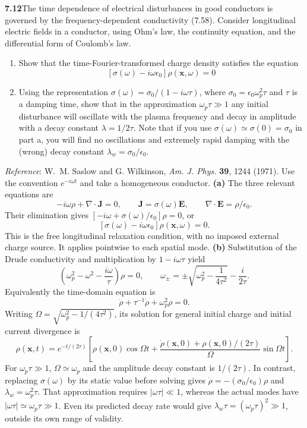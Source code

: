 \par\bigskip
\noindent\textbf{7.12}\quad The time dependence of electrical disturbances in good conductors is governed by the frequency-dependent conductivity (7.58). Consider longitudinal electric fields in a conductor, using Ohm's law, the continuity equation, and the differential form of Coulomb's law.
\begin{enumerate}
\item[(a)] Show that the time-Fourier-transformed charge density satisfies the equation
\[
[\sigma(\omega)-i\omega\epsilon_{0}]\rho(\mathbf{x},\omega)=0
\]
\item[(b)] Using the representation $\sigma(\omega)=\sigma_{0}/(1-i\omega\tau)$, where $\sigma_{0}=\epsilon_{0}\omega_{p}^{2}\tau$ and $\tau$ is a damping time, show that in the approximation $\omega_{p}\tau\gg1$ any initial disturbance will oscillate with the plasma frequency and decay in amplitude with a decay constant $\lambda=1/2\tau$. Note that if you use $\sigma(\omega)\simeq\sigma(0)=\sigma_{0}$ in part a, you will find no oscillations and extremely rapid damping with the (wrong) decay constant $\lambda_{w}=\sigma_{0}/\epsilon_{0}$.
\end{enumerate}
\emph{Reference}: W.~M. Saslow and G. Wilkinson, \emph{Am. J. Phys.} \textbf{39}, 1244 (1971).
\solution
Use the convention $e^{-i\omega t}$ and take a homogeneous conductor.
\textbf{(a)} The three relevant equations are
\[
-i\omega\rho+\nabla\cdot\mathbf J=0,\qquad
\mathbf J=\sigma(\omega)\mathbf E,\qquad
\nabla\cdot\mathbf E=\rho/\epsilon_0.
\]
Their elimination gives
$[-i\omega+\sigma(\omega)/\epsilon_0]\rho=0$, or
\[
\boxed{[\sigma(\omega)-i\omega\epsilon_0]\rho(\mathbf x,\omega)=0.}
\]
This is the free longitudinal relaxation condition, with no imposed
external charge source. It applies pointwise to each spatial mode.
\textbf{(b)} Substitution of the Drude conductivity and multiplication
by $1-i\omega\tau$ yield
\[
\left(\omega_p^2-\omega^2-\frac{i\omega}{\tau}\right)\rho=0,
\qquad
\omega_\pm=\pm\sqrt{\omega_p^2-\frac{1}{4\tau^2}}-\frac{i}{2\tau}.
\]
Equivalently the time-domain equation is
\[
\ddot\rho+\tau^{-1}\dot\rho+\omega_p^2\rho=0.
\]
Writing $\Omega=\sqrt{\omega_p^2-1/(4\tau^2)}$, its solution for
general initial charge and initial current divergence is
\[
\boxed{\rho(\mathbf x,t)=e^{-t/(2\tau)}
\left[\rho(\mathbf x,0)\cos\Omega t+
\frac{\dot\rho(\mathbf x,0)+\rho(\mathbf x,0)/(2\tau)}{\Omega}
\sin\Omega t\right].}
\]
For $\omega_p\tau\gg1$, $\Omega\simeq\omega_p$ and the amplitude
decay constant is $1/(2\tau)$. In contrast, replacing $\sigma(\omega)$
by its static value before solving gives
$\dot\rho=-(\sigma_0/\epsilon_0)\rho$ and
$\lambda_w=\omega_p^2\tau$. That approximation requires
$|\omega\tau|\ll1$, whereas the actual modes have
$|\omega\tau|\simeq\omega_p\tau\gg1$. Even its predicted decay rate
would give $\lambda_w\tau=(\omega_p\tau)^2\gg1$, outside its own
range of validity.

